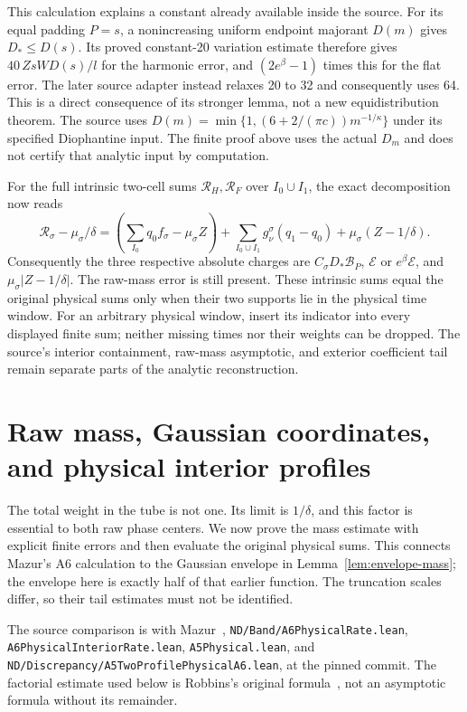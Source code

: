 \documentclass[11pt]{article}
\theoremstyle{remark}\newtheorem{remark}[proposition]{Remark}
\begin{document}
This calculation explains a constant already available inside the
source. For its equal padding $P=s$, a nonincreasing uniform
endpoint majorant $D(m)$ gives $D_*\le D(s)$.
Its proved constant-20 variation estimate therefore gives
$40\,ZsW D(s)/l$ for the harmonic error, and
$(2e^\beta-1)$ times this for the flat error.
The later source adapter instead relaxes 20 to 32 and consequently
uses 64. This is a direct consequence of its stronger lemma, not
a new equidistribution theorem. The source uses
$D(m)=\min\{1,(6+2/(\pi c))m^{-1/\kappa}\}$ under its
specified Diophantine input. The finite proof above uses the
actual $D_m$ and does not certify that analytic input by computation.

For the full intrinsic two-cell sums $\mathcal R_H,\mathcal R_F$
over $I_0\cup I_1$, the exact decomposition now reads
\[
 \mathcal R_\sigma-\mu_\sigma/\delta
 =\left(\sum_{I_0}q_0f_\sigma-\mu_\sigma Z\right)
       +\sum_{I_0\cup I_1}g_\nu^\sigma(q_1-q_0)
       +\mu_\sigma(Z-1/\delta).
\]
Consequently the three respective absolute charges are
$C_\sigma D_*\mathcal B_P$,
$\mathcal E$ or $e^\beta\mathcal E$,
and $\mu_\sigma|Z-1/\delta|$.
The raw-mass error is still present. These intrinsic sums equal
the original physical sums only when their two supports lie in
the physical time window. For an arbitrary physical window, insert
its indicator into every displayed finite sum; neither missing
times nor their weights can be dropped. The source's interior
containment, raw-mass asymptotic, and exterior coefficient tail
remain separate parts of the analytic reconstruction.

\section{Raw mass, Gaussian coordinates, and physical interior profiles}
\label{sec:mazur-mass-interior}

The total weight in the tube is not one. Its limit is $1/\delta$,
and this factor is essential to both raw phase centers. We now prove
the mass estimate with explicit finite errors and then evaluate the
original physical sums. This connects Mazur's A6 calculation to the
Gaussian envelope in Lemma~\ref{lem:envelope-mass}; the envelope here
is exactly half of that earlier function. The truncation scales differ,
so their tail estimates must not be identified.

The source comparison is with Mazur~\cite{Mazur2026v2},
\texttt{ND/Band/A6PhysicalRate.lean},
\texttt{A6PhysicalInteriorRate.lean}, \texttt{A5Physical.lean},
and \texttt{ND/Discrepancy/A5TwoProfilePhysicalA6.lean}, at the pinned
commit. The factorial estimate used below is Robbins's original
formula~\cite[(1)--(2), p.~26]{Robbins1955}, not an asymptotic formula
without its remainder.
\end{document}
